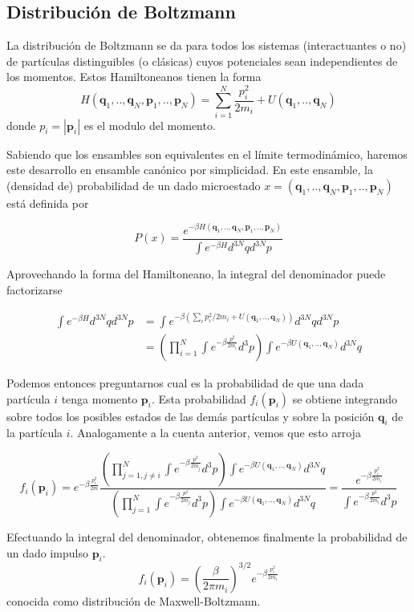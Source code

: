 \subsection{Distribución de Boltzmann}{\label{ap:boltzmann}}

La distribución de Boltzmann se da para todos los sistemas (interactuantes o no) de partículas distinguibles (o clásicas) cuyos potenciales sean independientes de los momentos.
Estos Hamiltoneanos tienen la forma
\[ H(\mathbf{q}_1,..,\mathbf{q}_N,\mathbf{p}_1,..,\mathbf{p}_N) = \sum_{i=1}^N \frac{p_i^2}{2m_i} + U(\mathbf{q}_1,..,\mathbf{q}_N)\]
donde $p_i = |\mathbf{p}_i|$ es el modulo del momento.

Sabiendo que los ensambles son equivalentes en el límite termodinámico, haremos este desarrollo en ensamble canónico por simplicidad.
En este ensamble, la (densidad de) probabilidad de un dado microestado $x=(\mathbf{q}_1,..,\mathbf{q}_N,\mathbf{p}_1,..,\mathbf{p}_N)$ está definida por

\[ P(x) = \frac{e^{-\beta H(\mathbf{q}_1,..,\mathbf{q}_N,\mathbf{p}_1,..,\mathbf{p}_N)}}{\int e^{-\beta H} d^{3N}qd^{3N}p} \]

Aprovechando la forma del Hamiltoneano, la integral del denominador puede factorizarse

\begin{align*}
\int e^{-\beta H} d^{3N}qd^{3N}p &= \int e^{-\beta \left( \sum_i p_i^2/2m_i + U(\mathbf{q}_1,..,\mathbf{q}_N)\right)} d^{3N}qd^{3N}p \\
&= \left(\prod_{i=1}^N\int e^{-\beta\frac{p^2}{2m_i}} d^{3}p\right) \int e^{-\beta U(\mathbf{q}_1,..,\mathbf{q}_N)} d^{3N}q
\end{align*}

Podemos entonces preguntarnos cual es la probabilidad de que una dada partícula $i$ tenga momento $\mathbf{p}_i$.
Esta probabilidad $f_i(\mathbf{p}_i)$ se obtiene integrando sobre todos los posibles estados de las demás partículas y sobre la posición $\mathbf{q}_i$ de la partícula $i$.
Analogamente a la cuenta anterior, vemos que esto arroja

\[ f_i(\mathbf{p}_i) = e^{-\beta\frac{p_i^2}{2m}}\frac{\left(\prod_{j=1, j\neq i}^N\int e^{-\beta\frac{p^2}{2m_j}} d^{3}p\right) \int e^{-\beta U(\mathbf{q}_1,..,\mathbf{q}_N)} d^{3N}q}
{\left(\prod_{j=1}^N\int e^{-\beta\frac{p^2}{2m_j}} d^{3}p\right) \int e^{-\beta U(\mathbf{q}_1,..,\mathbf{q}_N)} d^{3N}q}
= \frac{e^{-\beta\frac{p_i^2}{2m_i}}}{\int e^{-\beta\frac{p^2}{2m_i}} d^3p} \]

Efectuando la integral del denominador, obtenemos finalmente la probabilidad de un dado impulso $\mathbf{p}_i$.
\begin{equation}
f_i(\mathbf{p}_i) = \left(\frac{\beta}{2\pi m_i} \right)^{3/2} e^{-\beta\frac{p_i^2}{2m_i}}
\end{equation}
conocida como distribución de Maxwell-Boltzmann.

